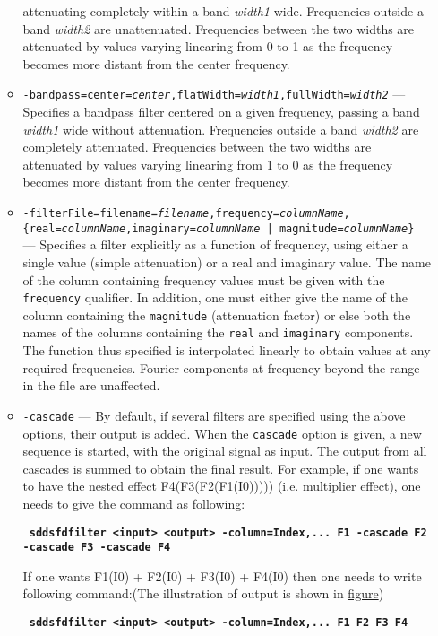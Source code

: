 \begin{itemize}
\begin{itemize}
    attenuating completely within a band {\em width1} wide.  
    Frequencies outside a band {\em width2} are unattenuated. 
    Frequencies between the two widths are attenuated by values varying 
    linearing from 0 to 1 as the frequency becomes more distant from 
    the center frequency. 
    \item {\tt -bandpass=center={\em center},flatWidth={\em width1},fullWidth={\em width2}} 
    --- Specifies a bandpass filter centered on a given frequency,  
    passing a band {\em width1} wide without attenuation. 
    Frequencies outside a band {\em width2} are completely attenuated. 
    Frequencies between the two widths are attenuated by values varying 
    linearing from 1 to 0 as the frequency becomes more distant from 
    the center frequency. 
    \item {\tt -filterFile=filename={\em filename},frequency={\em columnName},}
        {\tt \{real={\em columnName},imaginary={\em columnName} | magnitude={\em columnName}\} }
        --- Specifies a filter explicitly 
    as a function of frequency, using either a single value  
    (simple attenuation) or a real and imaginary value. 
    The name of the column containing frequency values must be 
    given with the {\tt frequency} qualifier. 
    In addition, one must either give the name of the column  
    containing the {\tt magnitude} (attenuation factor) or else 
    both the names of the columns containing  
    the {\tt real} and {\tt imaginary} components.   
    The function thus specified is interpolated linearly to 
    obtain values at any required frequencies.  Fourier components 
    at frequency beyond the range in the file are unaffected. 
    \item {\tt -cascade} --- By default, if several filters are 
    specified using the above options, their output is added.
    When the {\tt cascade} option is given, a 
    new sequence is started, with the original signal as input. 
    The output from all cascades is summed to obtain the final 
    result. For example, if one wants to have the nested effect 
    F4(F3(F2(F1(I0))))) (i.e. multiplier effect), one needs to give the command as following:
     \begin{flushleft}{\tt \bf
    sddsfdfilter <input> <output> -column=Index,... F1 -cascade F2 -cascade F3 -cascade F4 
     }\end{flushleft}

    If one wants F1(I0) + F2(I0) + F3(I0) + F4(I0) then one needs to write following command:(The illustration of output is shown in \href{https://ops.aps.anl.gov/manuals/example_files/sddsfdfilter_img1.html}{figure})
    \begin{flushleft}{\tt \bf
    sddsfdfilter <input> <output> -column=Index,... F1 F2 F3 F4 
    }\end{flushleft}


\end{itemize}
\end{itemize}
